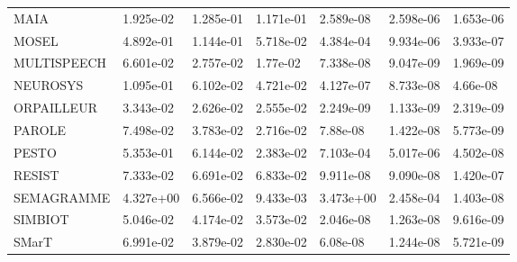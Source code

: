 \begin{tabular}{lllllll}
MAIA        &                    1.925e-02 &                    1.285e-01 &                    1.171e-01 &                         2.589e-08 &                         2.598e-06 &                         1.653e-06 \\
MOSEL       &                    4.892e-01 &                    1.144e-01 &                    5.718e-02 &                         4.384e-04 &                         9.934e-06 &                         3.933e-07 \\
MULTISPEECH &                    6.601e-02 &                    2.757e-02 &                     1.77e-02 &                         7.338e-08 &                         9.047e-09 &                         1.969e-09 \\
NEUROSYS    &                    1.095e-01 &                    6.102e-02 &                    4.721e-02 &                         4.127e-07 &                         8.733e-08 &                          4.66e-08 \\
ORPAILLEUR  &                    3.343e-02 &                    2.626e-02 &                    2.555e-02 &                         2.249e-09 &                         1.133e-09 &                         2.319e-09 \\
PAROLE      &                    7.498e-02 &                    3.783e-02 &                    2.716e-02 &                          7.88e-08 &                         1.422e-08 &                         5.773e-09 \\
PESTO       &                    5.353e-01 &                    6.144e-02 &                    2.383e-02 &                         7.103e-04 &                         5.017e-06 &                         4.502e-08 \\
RESIST      &                    7.333e-02 &                    6.691e-02 &                    6.833e-02 &                         9.911e-08 &                         9.090e-08 &                         1.420e-07 \\
SEMAGRAMME  &                    4.327e+00 &                    6.566e-02 &                    9.433e-03 &                         3.473e+00 &                         2.458e-04 &                         1.403e-08 \\
SIMBIOT     &                    5.046e-02 &                    4.174e-02 &                    3.573e-02 &                         2.046e-08 &                         1.263e-08 &                         9.616e-09 \\
SMarT       &                    6.991e-02 &                    3.879e-02 &                    2.830e-02 &                          6.08e-08 &                         1.244e-08 &                         5.721e-09 \\

\end{tabular}
